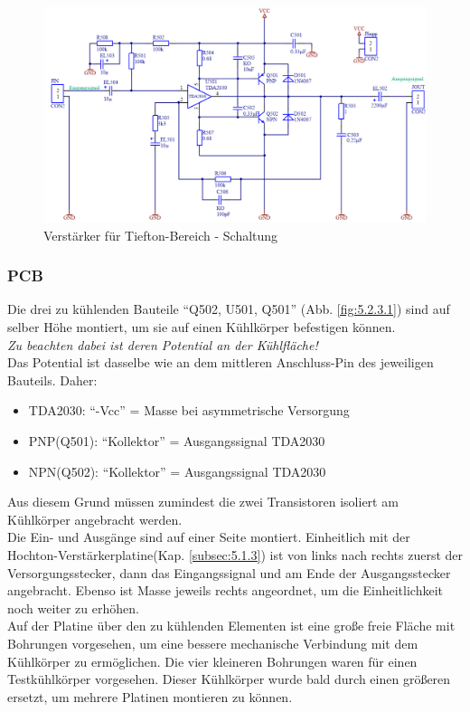 \begin{figure} [H]
	\centering	
	\includegraphics[width=1\textwidth]{img/Print5/5_TTVerstaerker-Schem.PNG}
	\caption{Verstärker für Tiefton-Bereich - Schaltung}
	\label {fig:5.2.2.1}
\end{figure}

\newpage
\subsubsection{PCB}\label{subsec:5.2.3}
Die drei zu kühlenden Bauteile \enquote{Q502, U501, Q501} (Abb. \ref{fig:5.2.3.1}) sind auf selber Höhe montiert, um sie auf einen Kühlkörper befestigen können.\\
\emph{Zu beachten dabei ist deren Potential an der Kühlfläche!}\\
Das Potential ist dasselbe wie an dem mittleren Anschluss-Pin des jeweiligen Bauteils.
Daher:
\begin{itemize}
	\item TDA2030: \enquote{-Vcc} = Masse bei asymmetrische Versorgung
	\item PNP(Q501): \enquote{Kollektor} = Ausgangssignal TDA2030
	\item NPN(Q502): \enquote{Kollektor} = Ausgangssignal TDA2030
\end{itemize}

Aus diesem Grund müssen zumindest die zwei Transistoren isoliert am Kühlkörper angebracht werden.\\
Die Ein- und Ausgänge sind auf einer Seite montiert. 
Einheitlich mit der Hochton-Verstärkerplatine(Kap. \ref{subsec:5.1.3}) ist von links nach rechts zuerst der Versorgungsstecker, dann das Eingangssignal und am Ende der Ausgangsstecker angebracht.
Ebenso ist Masse jeweils rechts angeordnet, um die Einheitlichkeit noch weiter zu erhöhen.\\
Auf der Platine über den zu kühlenden Elementen ist eine große freie Fläche mit Bohrungen vorgesehen, um eine bessere mechanische Verbindung mit dem Kühlkörper zu ermöglichen.
Die vier kleineren Bohrungen waren für einen Testkühlkörper vorgesehen. 
Dieser Kühlkörper wurde bald durch einen größeren ersetzt, um mehrere Platinen montieren zu können.

